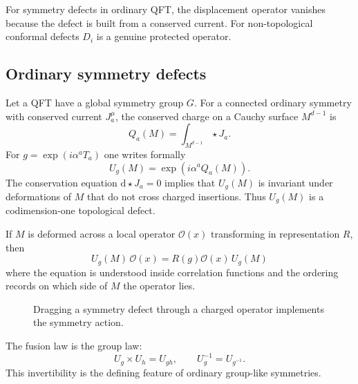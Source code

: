 \documentclass[11pt]{article}
\newcommand{\dd}{\mathrm{d}}
\newcommand{\cO}{\mathcal{O}}
\begin{document}
For symmetry defects in ordinary QFT, the displacement operator vanishes because the defect is built from a conserved current.  For non-topological conformal defects $D_i$ is a genuine protected operator.

\subsection{Ordinary symmetry defects}

Let a QFT have a global symmetry group $G$.  For a connected ordinary symmetry with conserved current $J^\mu_a$, the conserved charge on a Cauchy surface $M^{d-1}$ is
\begin{equation}
  Q_a(M)=\int_{M^{d-1}} \star J_a .
\end{equation}
For $g=\exp(i\alpha^a T_a)$ one writes formally
\begin{equation}
  U_g(M)=\exp\left(i\alpha^a Q_a(M)\right) .
\end{equation}
The conservation equation $\dd \star J_a=0$ implies that $U_g(M)$ is invariant under deformations of $M$ that do not cross charged insertions.  Thus $U_g(M)$ is a codimension-one topological defect.

If $M$ is deformed across a local operator $\cO(x)$ transforming in representation $R$, then
\begin{equation}
  U_g(M)\,\cO(x)=R(g)\cO(x)\,U_g(M)
\end{equation}
where the equation is understood inside correlation functions and the ordering records on which side of $M$ the operator lies.

\begin{figure}[htbp]
\centering
{}
\caption{Dragging a symmetry defect through a charged operator implements the symmetry action.}
\end{figure}

The fusion law is the group law:
\begin{equation}
  U_g\times U_h=U_{gh},\qquad U_g^{-1}=U_{g^{-1}} .
\end{equation}
This invertibility is the defining feature of ordinary group-like symmetries.
\end{document}
